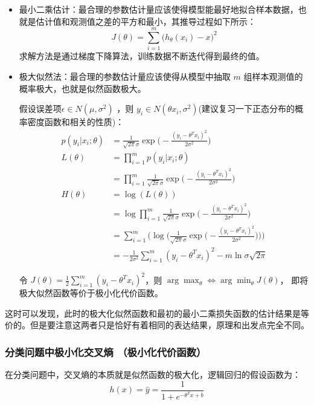 \documentclass[12pt]{article}
\begin{document}
\begin{itemize}
\setlength{\itemsep}{0pt}
\setlength{\parsep}{0pt}
\setlength{\parskip}{0pt}
    \item 最小二乘估计：最合理的参数估计量应该使得模型能最好地拟合样本数据，也就是估计值和观测值之差的平方和最小，其推导过程如下所示：
    $$
    J(\theta) = \sum_{i=1}^m\Big(h_{\theta}(x_i) - x\Big)^2
    $$
    求解方法是通过梯度下降算法，训练数据不断迭代得到最终的值。

    \item 极大似然法：最合理的参数估计量应该使得从模型中抽取 $m$ 组样本观测值的概率极大，也就是似然函数极大。

假设误差项$\epsilon \in N(\mu, \sigma^2)$ ，则 $y_i \in N(\theta x_i, \sigma^2)$(建议复习一下正态分布的概率密度函数和相关的性质)：
\begin{align*}
p(y_i|x_i; \theta) &= \frac{1}{\sqrt{2\pi}\sigma}\exp\Big(-\frac{(y_i - \theta^Tx_i)^2}{2\sigma^2}\Big) \\
L(\theta) &= \prod_{i=1}^mp(y_i|x_i;\theta) \\
	&= \prod_{i=1}^m\frac{1}{\sqrt{2\pi}\sigma}\exp\Big(-\frac{(y_i - \theta^Tx_i)^2}{2\sigma^2}\Big) \\
H(\theta) &= \log(L(\theta)) \\
	&= \log\prod_{i=1}^m\frac{1}{\sqrt{2\pi}\sigma}\exp\Big(-\frac{(y_i - \theta^Tx_i)^2}{2\sigma^2}\Big) \\
	&= \sum_{i=1}^m\Bigg(\log\bigg(\frac{1}{\sqrt{2\pi}\sigma}\exp\Big(-\frac{(y_i - \theta^Tx_i)^2}{2\sigma^2}\Big)\bigg)\Bigg) \\
	&= -\frac{1}{2\sigma^2}\sum_{i=1}^m(y_i - \theta^Tx_i)^2 - m\ln \sigma\sqrt{2\pi}
\end{align*}

令 $J(\theta) = \frac{1}{2}\sum_{i=1}^m(y_i - \theta^
Tx_i)^2$，则 $\arg\max_\theta \Leftrightarrow \arg\min_\theta J(\theta)$， 即将极大似然函数等价于极小化代价函数。
\end{itemize}

这时可以发现，此时的极大化似然函数和最初的最小二乘损失函数的估计结果是等价的。但是要注意这两者只是恰好有着相同的表达结果，原理和出发点完全不同。

\subsubsection{分类问题中极小化交叉熵 （极小化代价函数）}
在分类问题中，交叉熵的本质就是似然函数的极大化，逻辑回归的假设函数为：
$$
h(x) = \hat{y} = \frac{1}{1 + e^{-\theta^Tx + b}}
$$
\end{document}
